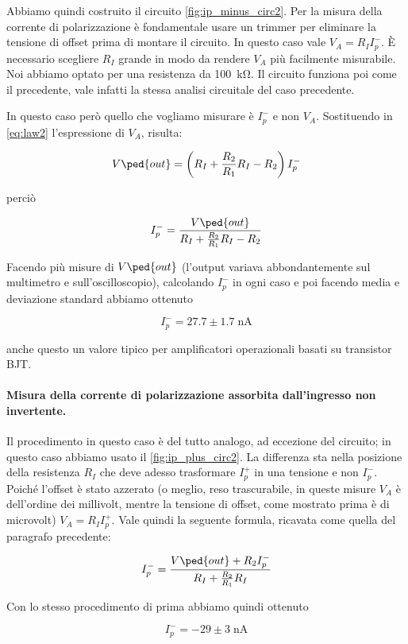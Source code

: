 Abbiamo quindi costruito il circuito \ref{fig:ip_minus_circ2}. Per la misura della corrente di polarizzazione
è fondamentale usare un trimmer per eliminare la tensione di offset prima di montare il circuito.
In questo caso vale $V_A = R_I I_p^-$. È necessario scegliere $R_I$ grande in modo da rendere $V_A$ più facilmente
misurabile. Noi abbiamo optato per una resistenza da \SI{100}{\kilo\ohm}. Il circuito funziona poi come il
precedente, vale infatti la stessa analisi circuitale del caso precedente.

In questo caso però quello che vogliamo misurare è $I_p^-$ e non $V_A$. Sostituendo in \eqref{eq:law2}
l'espressione di $V_A$, risulta:

\begin{equation}
    V\ped{out} = \left( R_I + \frac{R_2}{R_1} R_I - R_2 \right) I_p^-
\end{equation}

perciò

\begin{equation}
    I_p^- = \frac{V\ped{out}}{ R_I + \frac{R_2}{R_1} R_I - R_2}
\end{equation}

Facendo più misure di $V\ped{out}$ (l'output variava abbondantemente sul multimetro e sull'oscilloscopio),
calcolando $I_p^-$ in ogni caso e poi facendo media e deviazione standard abbiamo ottenuto

\begin{equation}
    I_p^- = 27.7 \pm 1.7 \; \si{\nano\ampere}
\end{equation}

anche questo un valore tipico per amplificatori operazionali basati su transistor BJT.

\paragraph{Misura della corrente di polarizzazione assorbita dall'ingresso non invertente.}

Il procedimento in questo caso è del tutto analogo, ad eccezione del circuito; in questo caso
abbiamo usato il \ref{fig:ip_plus_circ2}. La differenza sta nella posizione della resistenza $R_I$
che deve adesso trasformare $I_p^+$ in una tensione e non $I_p^-$. Poiché l'offset è stato azzerato
(o meglio, reso trascurabile, in queste misure $V_A$ è dell'ordine dei millivolt, mentre la tensione
di offset, come mostrato prima è di microvolt) $V_A = R_I I_p^+$. Vale quindi la seguente formula, ricavata
come quella del paragrafo precedente:

\begin{equation}
    I_p^- = \frac{V\ped{out} + R_2 I_p^-}{ R_I + \frac{R_2}{R_1} R_I}
\end{equation}

Con lo stesso procedimento di prima abbiamo quindi ottenuto

\begin{equation}
    I_p^- = -29 \pm 3 \; \si{\nano\ampere}
\end{equation}
